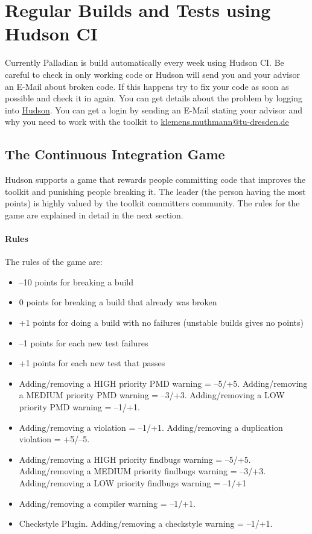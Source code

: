 \documentclass[a4paper,twoside]{book}      %
\begin{document}
\section{Regular Builds and Tests using Hudson CI}
Currently Palladian is build automatically every week using Hudson CI. Be careful to check in only working code or Hudson will send you and your advisor an E-Mail about broken code. If this happens try to fix your code as soon as possible and check it in again. You can get details about the problem by logging into \href{http://www.effingo.de/hudson}{Hudson}. You can get a login by sending an E-Mail stating your advisor and why you need to work with the toolkit to \href{mailto:klemens.muthmann@tu-dresden.de}{klemens.muthmann@tu-dresden.de}
\subsection{The Continuous Integration Game}
\label{sec:cigame}
Hudson supports a game that rewards people committing code that improves the toolkit and punishing people breaking it. The leader (the person having the most points) is highly valued by the toolkit committers community. The rules for the game are explained in detail in the next section.
\paragraph{Rules}
The rules of the game are:
\begin{itemize}
\item --10 points for breaking a build
\item 0 points for breaking a build that already was broken
\item +1 points for doing a build with no failures (unstable builds gives no points)
\item --1 points for each new test failures
\item +1 points for each new test that passes
\item Adding/removing a HIGH priority PMD warning = --5/+5. Adding/removing a MEDIUM priority PMD warning = --3/+3. Adding/removing a LOW priority PMD warning = --1/+1.
\item Adding/removing a violation = --1/+1. Adding/removing a duplication violation = +5/--5.
\item Adding/removing a HIGH priority findbugs warning = --5/+5. Adding/removing a MEDIUM priority findbugs warning = --3/+3. Adding/removing a LOW priority findbugs warning = --1/+1
\item Adding/removing a compiler warning = --1/+1.
\item Checkstyle Plugin. Adding/removing a checkstyle warning = --1/+1.
\end{itemize}
\end{document}
